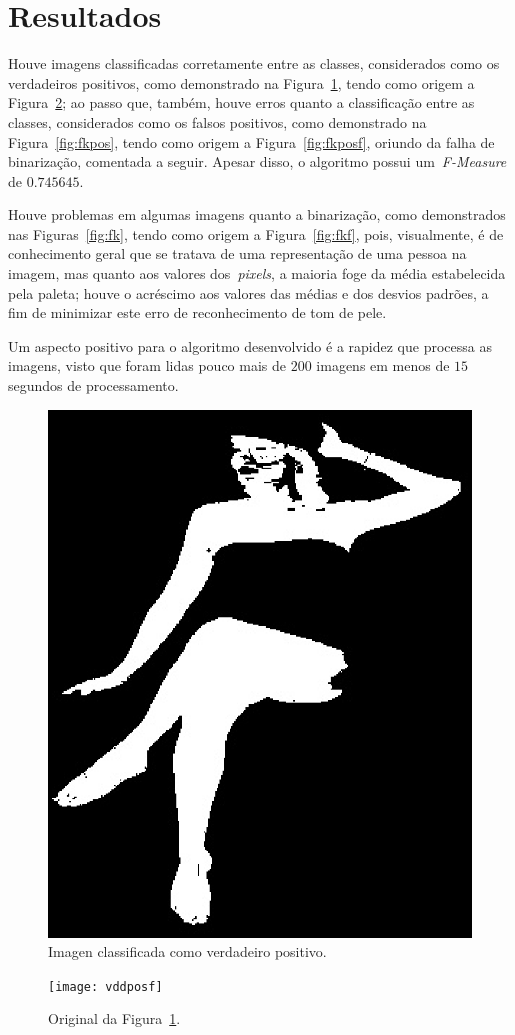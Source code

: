 \documentclass[conference]{Trabalho_1}
\begin{document}
\section{Resultados}
Houve imagens classificadas corretamente entre as classes, considerados como os verdadeiros positivos, como demonstrado na Figura~\ref{fig:vddpos}, tendo como origem a Figura~\ref{fig:vddposf}; ao passo que, tamb\'em, houve erros quanto a classifica\c{c}\~ao entre as classes, considerados como os falsos positivos, como demonstrado na Figura~\ref{fig:fkpos}, tendo como origem a Figura~\ref{fig:fkposf}, oriundo da falha de binariza\c{c}\~ao, comentada a seguir. Apesar disso, o algoritmo possui um~\textit{F-Measure} de $0.745645$.

Houve problemas em algumas imagens quanto a binariza\c{c}\~ao, como demonstrados nas Figuras~\ref{fig:fk}, tendo como origem a Figura~\ref{fig:fkf}, pois, visualmente, \'e de conhecimento geral que se tratava de uma representa\c{c}\~ao de uma pessoa na imagem, mas quanto aos valores dos~\textit{pixels}, a maioria foge da m\'edia estabelecida pela paleta; houve o acr\'escimo aos valores das m\'edias e dos desvios padr\~oes, a fim de minimizar este erro de reconhecimento de tom de pele.

Um aspecto positivo para o algoritmo desenvolvido \'e a rapidez que processa as imagens, visto que foram lidas pouco mais de $200$ imagens em menos de $15$ segundos de processamento.

\begin{figure}[!t]
  \centering
  \includegraphics[width = 4.5 cm]{vddpos}
  \caption{Imagen classificada como verdadeiro positivo.}
  \label{fig:vddpos}
\end{figure}

\begin{figure}[!t]
  \centering
  \texttt{[image: vddposf]}
  \caption{Original da Figura~\ref{fig:vddpos}.}
  \label{fig:vddposf}
\end{figure}
\end{document}
